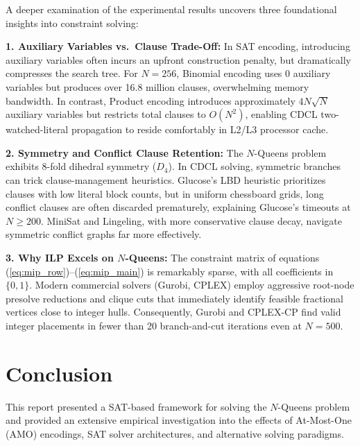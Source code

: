 \documentclass[a4paper,fleqn]{cas-sc}
\begin{document}
A deeper examination of the experimental results uncovers three foundational insights into constraint solving:

\noindent\textbf{1. Auxiliary Variables vs.\ Clause Trade-Off:} In SAT encoding, introducing auxiliary variables often incurs an upfront construction penalty, but dramatically compresses the search tree. For $N=256$, Binomial encoding uses 0 auxiliary variables but produces over 16.8 million clauses, overwhelming memory bandwidth. In contrast, Product encoding introduces approximately $4N\sqrt{N}$ auxiliary variables but restricts total clauses to $O(N^2)$, enabling CDCL two-watched-literal propagation to reside comfortably in L2/L3 processor cache.

\noindent\textbf{2. Symmetry and Conflict Clause Retention:} The $N$-Queens problem exhibits 8-fold dihedral symmetry ($D_4$). In CDCL solving, symmetric branches can trick clause-management heuristics. Glucose's LBD heuristic prioritizes clauses with low literal block counts, but in uniform chessboard grids, long conflict clauses are often discarded prematurely, explaining Glucose's timeouts at $N \ge 200$. MiniSat and Lingeling, with more conservative clause decay, navigate symmetric conflict graphs far more effectively.

\noindent\textbf{3. Why ILP Excels on $N$-Queens:} The constraint matrix of equations (\ref{eq:mip_row})--(\ref{eq:mip_main}) is remarkably sparse, with all coefficients in $\{0, 1\}$. Modern commercial solvers (Gurobi, CPLEX) employ aggressive root-node presolve reductions and clique cuts that immediately identify feasible fractional vertices close to integer hulls. Consequently, Gurobi and CPLEX-CP find valid integer placements in fewer than 20 branch-and-cut iterations even at $N=500$.

\section{Conclusion}
\label{sec:conclusion}

This report presented a SAT-based framework for solving the $N$-Queens problem and provided an extensive empirical investigation into the effects of At-Most-One (AMO) encodings, SAT solver architectures, and alternative solving paradigms. 
\end{document}
